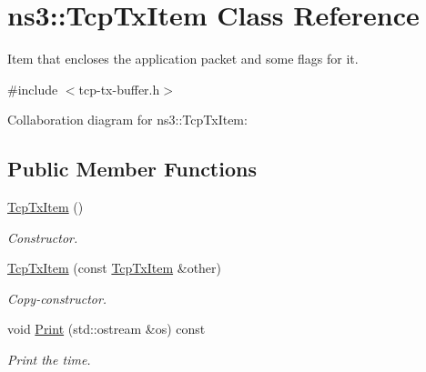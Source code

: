 \hypertarget{classns3_1_1TcpTxItem}{}\section{ns3\+:\+:Tcp\+Tx\+Item Class Reference}
\label{classns3_1_1TcpTxItem}


Item that encloses the application packet and some flags for it.  




{\ttfamily \#include $<$tcp-\/tx-\/buffer.\+h$>$}



Collaboration diagram for ns3\+:\+:Tcp\+Tx\+Item\+:
\subsection*{Public Member Functions}
\begin{DoxyCompactItemize}
\item 
\hyperlink{classns3_1_1TcpTxItem_a2dee82bccbf7ca489d2b6f79e2e443ab}{Tcp\+Tx\+Item} ()
\begin{DoxyCompactList}\small\item\em Constructor. \end{DoxyCompactList}\item 
\hyperlink{classns3_1_1TcpTxItem_aced0cc7a1957142efdd4d3217777d001}{Tcp\+Tx\+Item} (const \hyperlink{classns3_1_1TcpTxItem}{Tcp\+Tx\+Item} \&other)
\begin{DoxyCompactList}\small\item\em Copy-\/constructor. \end{DoxyCompactList}\item 
void \hyperlink{classns3_1_1TcpTxItem_a84011a67a0dfc7dc18f581b6fb10ed59}{Print} (std\+::ostream \&os) const 
\begin{DoxyCompactList}\small\item\em Print the time. \end{DoxyCompactList}\end{DoxyCompactItemize}

